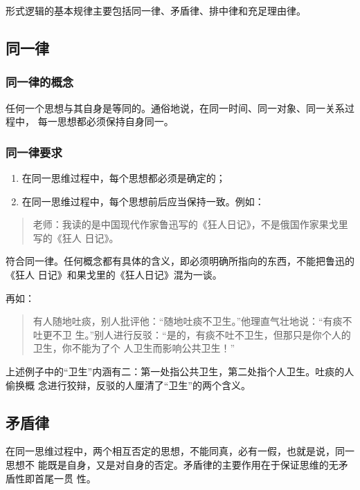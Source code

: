\documentclass[final,oneside]{ctexbook}
\newenvironment{equotation}{\begin{quotation}\kaishu}{\end{quotation}}
\begin{document}
形式逻辑的基本规律主要包括同一律、矛盾律、排中律和充足理由律。

\subsection{同一律}

\subsubsection{同一律的概念}

任何一个思想与其自身是等同的。通俗地说，在同一时间、同一对象、同一关系过程中，
每一思想都必须保持自身同一。

\subsubsection{同一律要求}

\begin{enumerate}
  \item 在同一思维过程中，每个思想都必须是确定的；

  \item 在同一思维过程中，每个思想前后应当保持一致。例如：
\end{enumerate}

\begin{equotation}
  老师：我读的是中国现代作家鲁迅写的《狂人日记》，不是俄国作家果戈里写的《狂人
  日记》。
\end{equotation}
符合同一律。任何概念都有具体的含义，即必须明确所指向的东西，不能把鲁迅的《狂人
日记》和果戈里的《狂人日记》混为一谈。

再如：
\begin{equotation}
  有人随地吐痰，别人批评他：“随地吐痰不卫生。”他理直气壮地说：“有痰不吐更不卫
  生。”别人进行反驳：“是的，有痰不吐不卫生，但那只是你个人的卫生，你不能为了个
  人卫生而影响公共卫生！”
\end{equotation}
上述例子中的“卫生”内涵有二：第一处指公共卫生，第二处指个人卫生。吐痰的人偷换概
念进行狡辩，反驳的人厘清了“卫生”的两个含义。

\subsection{矛盾律}

在同一思维过程中，两个相互否定的思想，不能同真，必有一假，也就是说，同一思想不
能既是自身，又是对自身的否定。矛盾律的主要作用在于保证思维的无矛盾性即首尾一贯
性。
\end{document}
